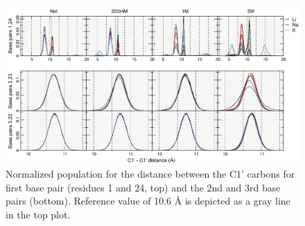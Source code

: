 \documentclass[9pt,lessons]{livecoms}
\begin{document}
\begin{figure}
\includegraphics[width=\linewidth]{10us-distance-fraying-ALL}
\caption{Normalized population for the distance between the C1’ carbons for first base pair (residues 1 and 24, top) and the 2nd and 3rd base pairs (bottom). Reference value of 10.6 Å is depicted as a gray line in the top plot.}
\label{10us-distance-fraying-ALL}
\end{figure}
\end{document}
